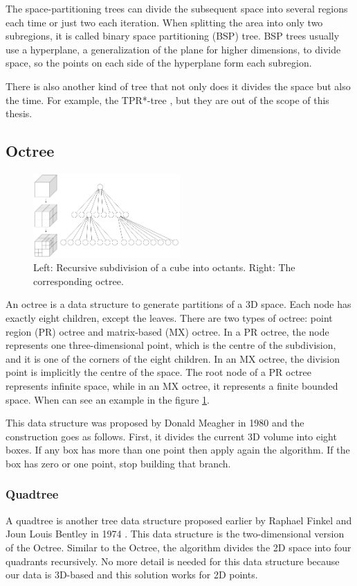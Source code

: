 The space-partitioning trees can divide the subsequent space into several regions each time or just two each iteration. When splitting the area into only two subregions, it is called binary space partitioning (BSP) tree. BSP trees usually use a hyperplane, a generalization of the plane for higher dimensions, to divide space, so the points on each side of the hyperplane form each subregion.

There is also another kind of tree that not only does it divides the space but also the time. For example, the TPR*-tree \cite{TPRtree}, but they are out of the scope of this thesis.

\subsection{Octree}
\begin{figure}
    \centering
    \includegraphics[width=0.5\textwidth]{setup/img/Octree.png}
    \caption{Left: Recursive subdivision of a cube into octants. Right: The corresponding octree. \cite{wiki:octree}}
    \label{fig:octree}
\end{figure}
An octree is a data structure to generate partitions of a 3D space. Each node has exactly eight children, except the leaves. There are two types of octree: point region (PR) octree and matrix-based (MX) octree. In a PR octree, the node represents one three-dimensional point, which is the centre of the subdivision, and it is one of the corners of the eight children. In an MX octree, the division point is implicitly the centre of the space. The root node of a PR octree represents infinite space, while in an MX octree, it represents a finite bounded space. When can see an example in the figure \ref{fig:octree}.

This data structure was proposed by Donald Meagher in 1980 \cite{Octree} and the construction goes as follows. First, it divides the current 3D volume into eight boxes. If any box has more than one point then apply again the algorithm. If the box has zero or one point, stop building that branch.

\subsubsection{Quadtree}
A quadtree is another tree data structure proposed earlier by Raphael Finkel and Joun Louis Bentley in 1974 \cite{Quadtree}. This data structure is the two-dimensional version of the Octree. Similar to the Octree, the algorithm divides the 2D space into four quadrants recursively. No more detail is needed for this data structure because our data is 3D-based and this solution works for 2D points.

